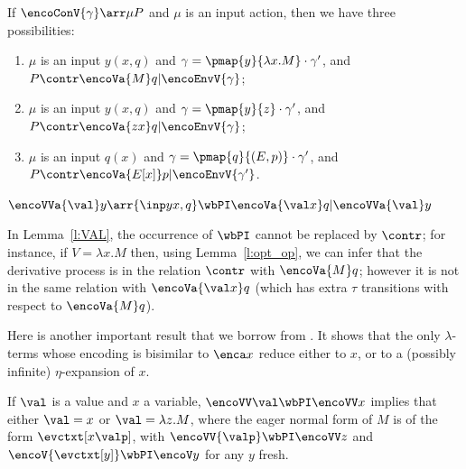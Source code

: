 \begin{lemma} %
\label{l:opt_con}
If  $\encoConV{\gamma } \arr \mu P$ and $\mu$ is an input action, then we have three possibilities:
\begin{enumerate}

\item $\mu $ is an input $y(x,q)$ and $\gamma 
= \pmap{y}{\lambda x . M}\cdot\gamma' $, and $P \contr 
\encoVa {M} q  | \encoEnvV{\gamma  } $; 

\item $\mu $ is an input $y(x,q)$ and $\gamma 
= \pmap{y}{z}\cdot\gamma' $, and $P \contr 
\encoVa {zx} q  | \encoEnvV{\gamma  } $; 


\item $\mu $ is an input $q(x)$ and $\gamma 
= \pmap{q}{(E,p)}\cdot\gamma' $, and $P\contr 
\encoVa {E[x]} p  | \encoEnvV{\gamma'  } $. 
\end{enumerate} 
\end{lemma}
 

\begin{lemma}
\label{l:VAL}
  $\encoVVa {\val} y  \arr {\inp y {x,q}} \wbPI 
\encoVa {\val x } q | \encoVVa {\val} y$
\end{lemma}              
\noindent
In Lemma~\ref{l:VAL}, the occurrence of $ \wbPI$ cannot be replaced by $\contr$; 
for instance, if $V = \lambda x. M$ then, using Lemma~\ref{l:opt_op}, we can infer that 
the derivative process is in the relation $\contr$ with 
$\encoVa {M } q$; however it is not in the same relation with 
$\encoVa {\val x } q$ (which has extra $\tau$ transitions with respect to $\encoVa {M } q$).

 
\iflong
{} 
Here is another important result that we borrow from \cite{DurierHS18}.
It shows  that the only $\lambda$-terms
 whose encoding is bisimilar to 
$\enca x$ reduce either to $x$, or to a (possibly infinite) 
$\eta$-expansion of $x$.

\begin{lemma}\label{l:opt_eta}
  If $\val$ is a value and $x$ a variable,
  $\encoVV \val\wbPI \encoVV x$ %
  implies that either $\val=x$ or $\val = \lambda   z. {M}$, where the eager
  normal form of $M$ is of the form $\evctxt[x\valp]$, with
  $\encoVV {\valp}\wbPI \encoVV z$ and $\encoV {\evctxt[y]}\wbPI\encoV y$
  for any $y$ fresh.
\end{lemma}


